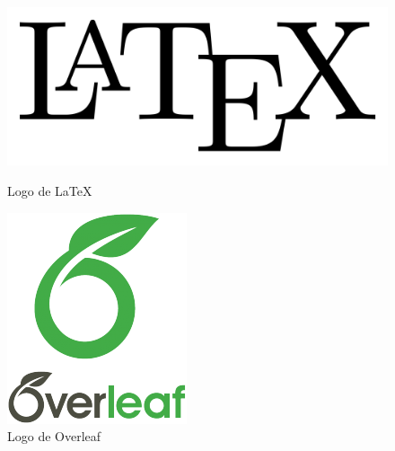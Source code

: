 \begin{figure}[H]
    \centering
    \begin{minipage}{0.2\textwidth}
        \centering
        \includegraphics[width=\textwidth]{figures/7-Construccion/LaTeX.png}
        \caption{Logo de LaTeX}
    \end{minipage}
    \hspace{0.05\textwidth}
    \begin{minipage}{0.2\textwidth}
        \centering
        \includegraphics[width=\textwidth]{figures/7-Construccion/Overleaf.png}
        \caption{Logo de Overleaf}
    \end{minipage}
\end{figure}


